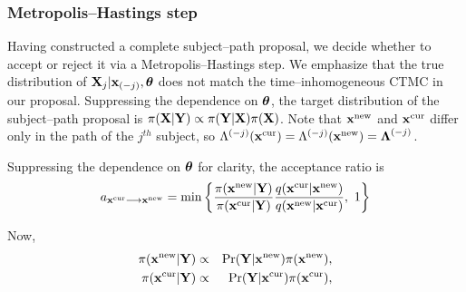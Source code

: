 \subsubsection{Metropolis--Hastings step}
Having constructed a complete subject--path proposal, we decide whether to accept or reject it via a Metropolis--Hastings step. We emphasize that the true distribution of $ \mathbf{X}_j | \mathbf{x}_{(-j)},\boldsymbol{\theta} $ does not match the time--inhomogeneous CTMC in our proposal. Suppressing the dependence on $ \boldsymbol{\theta} $, the target distribution of the subject--path proposal is $ \pi(\mathbf{X} | \mathbf{Y}) \propto\pi(\mathbf{Y} | \mathbf{X})\pi(\mathbf{X}) $. Note that $ \mathbf{x}^{\mathrm{new}} $ and $ \mathbf{x}^{\mathrm{cur}} $ differ only in the path of the $ j^{th} $ subject, so $ \Lambda^{(-j)}(\mathbf{x}^{\mathrm{cur}}) = \Lambda^{(-j)}(\mathbf{x}^{\mathrm{new}})=\boldsymbol{\Lambda}^{(-j)} $.

Suppressing the dependence on $ \boldsymbol{\theta}$ for clarity, the acceptance ratio is
\begin{equation*}
a_{\xcur \longrightarrow \xnew} = \min \left \lbrace \frac{\pi(\xnew|\by)}{\pi(\xcur|\by)}\frac{q(\xcur|\xnew)}{q(\xnew|\xcur)},\ 1\right \rbrace
\end{equation*}

Now, \begin{eqnarray*}
	\pi(\mathbf{x}^{\mathrm{new}}|\mathbf{Y}) &\propto& \Pr(\mathbf{Y}|\mathbf{x}^{\mathrm{new}})\pi(\mathbf{x}^{\mathrm{new}}),\\
	\pi(\mathbf{x}^{\mathrm{cur}}|\mathbf{Y}) &\propto& \Pr(\mathbf{Y}|\mathbf{x}^{\mathrm{cur}})\pi(\mathbf{x}^{\mathrm{cur}}),
\end{eqnarray*}

